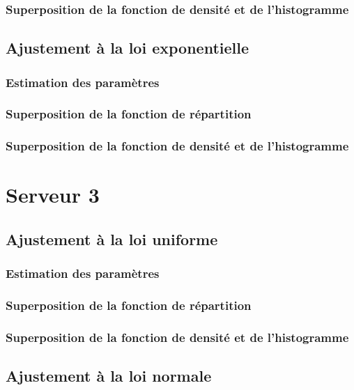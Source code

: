 \documentclass{article}
\begin{document}
\subsubsection{Superposition de la fonction de densité et de l'histogramme}

\subsection {Ajustement à la loi exponentielle}

\subsubsection{Estimation des paramètres}
\subsubsection{Superposition de la fonction de répartition}
\subsubsection{Superposition de la fonction de densité et de l'histogramme}

\section{Serveur 3}

\subsection{Ajustement à la loi uniforme}

\subsubsection{Estimation des paramètres}
\subsubsection{Superposition de la fonction de répartition}
\subsubsection{Superposition de la fonction de densité et de l'histogramme}

\subsection{Ajustement à la loi normale}
\end{document}
